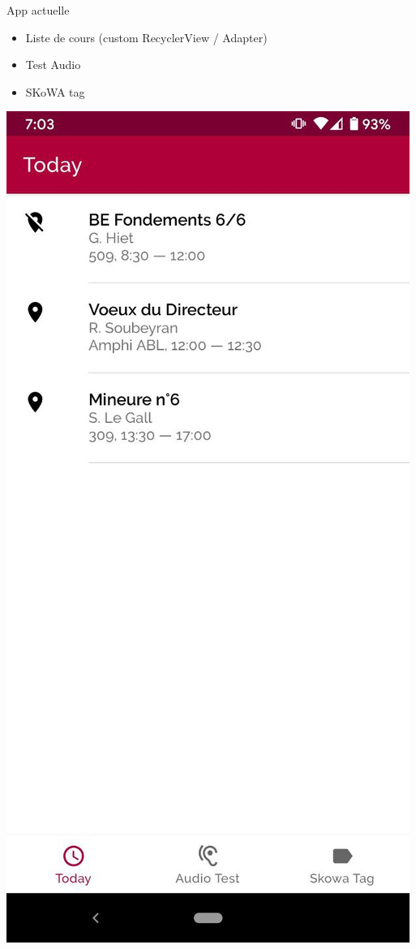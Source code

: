 \documentclass[aspectratio=169]{beamer}
\begin{document}
\begin{frame}{App actuelle}

  \begin{minipage}{.4\textwidth}
    \begin{itemize}
      \item Liste de cours (custom RecyclerView / Adapter)
      \item Test Audio
      \item SKoWA tag
    \end{itemize}
  \end{minipage}%
  \begin{minipage}{.3\textwidth}
    \centering
    \includegraphics[height=.8\textheight]{../assets/android1}

\end{minipage}
\end{frame}
\end{document}
